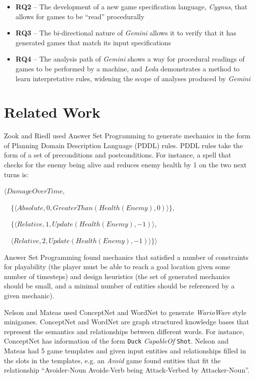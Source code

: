 \documentclass[12pt]{report}
\begin{document}
\begin{itemize}
\item \textbf{RQ2} -- The development of a new game specification language, \textit{Cygnus}, that allows for games to be ``read'' procedurally
\item \textbf{RQ3} -- The bi-directional nature of \textit{Gemini} allows it to verify that it has generated games that match its input specifications
\item \textbf{RQ4} -- The analysis path of \textit{Gemini} shows a way for procedural readings of games to be performed by a machine, and \textit{Leda} demonstrates a method to learn interpretative rules, widening the scope of analyses produced by \textit{Gemini}
\end{itemize}


\section*{Related Work}

Zook and Riedl \cite{zook2014automatic} used Answer Set Programming to generate mechanics in the form of Planning Domain Description Language (PDDL) rules.  PDDL rules take the form of a set of preconditions and postconditions.  For instance, a spell that checks for the enemy being
alive and reduces enemy health by 1 on the two next turns is:

$\langle DamageOverTime, $

$\quad \{\langle Absolute, 0, GreaterThan(Health(Enemy), 0)\rangle\}, $

$\quad \{\langle Relative, 1, Update(Health(Enemy), -1)\rangle, $

$ \quad  \langle Relative, 2,  Update(Health(Enemy),  -1)\rangle\}\rangle$

Answer Set Programming found mechanics that satisfied a number of constraints for playability (the player must be able to reach a goal location given some number of timesteps) and design heuristics (the set of generated mechanics should be small, and a minimal number of entities should be referenced by a given mechanic).  

Nelson and Mateas \cite{nelson2007towards} used ConceptNet \cite{liu2004conceptnet} and WordNet \cite{wordnet} to generate \textit{WarioWare} style minigames.  ConceptNet and WordNet are graph structured knowledge bases that represent the semantics and relationships between different words.  For instance, ConceptNet has information of the form \texttt{Duck} \textit{CapableOf} \texttt{Shot}.  Nelson and Mateas had 5 game templates and given input entities and relationships filled in the slots in the templates, e.g. an \textit{Avoid} game found entities that fit the relationship ``Avoider-Noun Avoids-Verb being Attack-Verbed by Attacker-Noun''.  
\end{document}
